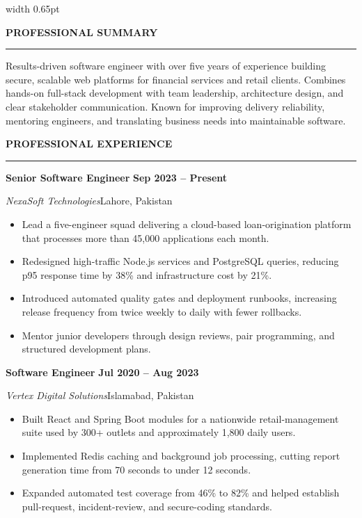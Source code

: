 \documentclass[10pt,a4paper]{article}
\newcommand{\cvsection}[1]{%
  \vspace{5pt}%
  {\fontsize{11.2}{12.5}\selectfont\bfseries\color{pakgreen}\MakeUppercase{#1}}\par
  \vspace{1pt}%
  {\color{crescent}\rule{\linewidth}{1.15pt}}\par
  \vspace{2pt}%
}
\newcommand{\job}[4]{%
  \textbf{\fontsize{10.5}{11.5}\selectfont\color{deepgreen}#1}\hfill
  {\fontsize{8.2}{9.2}\selectfont\bfseries\color{muted}#2}\par
  \textit{#3}\hfill{\fontsize{8.2}{9.2}\selectfont\color{muted}#4}\par
}
\begin{document}
\hfill
{\color{linegrey}\vrule width 0.65pt}%
\hfill
\begin{minipage}[t]{0.665\textwidth}
\vspace{0pt}
\fontsize{8.65}{10.15}\selectfont

\cvsection{Professional Summary}
Results-driven software engineer with over five years of experience building
secure, scalable web platforms for financial services and retail clients.
Combines hands-on full-stack development with team leadership, architecture
design, and clear stakeholder communication. Known for improving delivery
reliability, mentoring engineers, and translating business needs into
maintainable software.

\cvsection{Professional Experience}
\job{Senior Software Engineer}{Sep 2023 -- Present}
    {NexaSoft Technologies}{Lahore, Pakistan}
\begin{itemize}
  \item Lead a five-engineer squad delivering a cloud-based loan-origination
        platform that processes more than 45,000 applications each month.
  \item Redesigned high-traffic Node.js services and PostgreSQL queries,
        reducing p95 response time by 38\% and infrastructure cost by 21\%.
  \item Introduced automated quality gates and deployment runbooks, increasing
        release frequency from twice weekly to daily with fewer rollbacks.
  \item Mentor junior developers through design reviews, pair programming, and
        structured development plans.
\end{itemize}

\vspace{2pt}
\job{Software Engineer}{Jul 2020 -- Aug 2023}
    {Vertex Digital Solutions}{Islamabad, Pakistan}
\begin{itemize}
  \item Built React and Spring Boot modules for a nationwide retail-management
        suite used by 300+ outlets and approximately 1,800 daily users.
  \item Implemented Redis caching and background job processing, cutting report
        generation time from 70 seconds to under 12 seconds.
  \item Expanded automated test coverage from 46\% to 82\% and helped establish
        pull-request, incident-review, and secure-coding standards.
\end{itemize}


\end{minipage}
\end{document}
